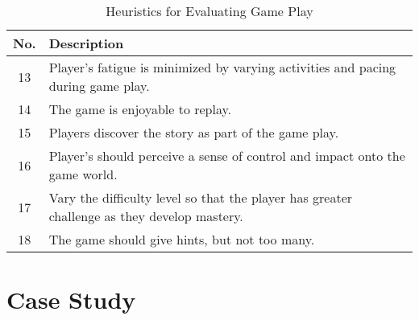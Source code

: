 \documentclass[12pt]{report}
\begin{document}
\begin{table}[ht]
\caption{Heuristics for Evaluating Game Play} %
\centering  %
\begin{tabular}{c p{\textwidth}}
\hline\hline                        %
No. & Description \\ [0.5ex] %
\hline                  %
13 & Player's fatigue is minimized by varying activities and pacing during game play.\cite{Desurvire}  \\ %
14 & The game is enjoyable to replay.\cite{Desurvire}  \\
15 & Players discover the story as part of the game play.\cite{Desurvire}  \\
16 & Player's should perceive a sense of control and impact onto the game world.\cite{Desurvire}  \\
17 & Vary the difficulty level so that the player has greater challenge as they develop mastery.\cite{Desurvire}  \\ 
18 & The game should give hints, but not too many.\cite{Federoff} \\ [1ex]%
\hline %
\end{tabular}
\label{tab:nonlin2} %
\end{table}

\section{Case Study}
\end{document}
